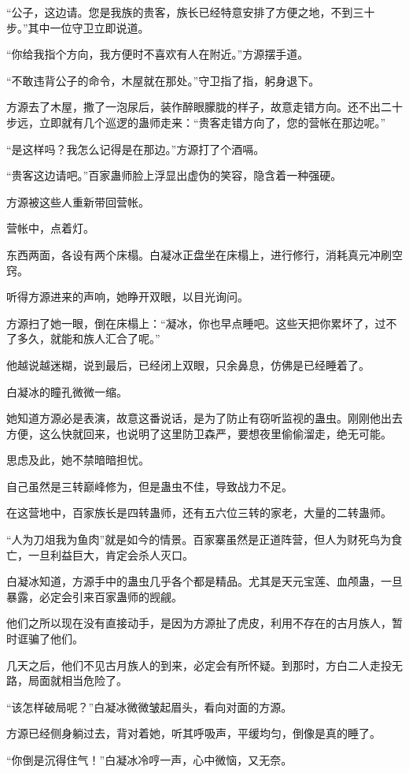 \begin{this_body}
“公子，这边请。您是我族的贵客，族长已经特意安排了方便之地，不到三十步。”其中一位守卫立即说道。

“你给我指个方向，我方便时不喜欢有人在附近。”方源摆手道。

“不敢违背公子的命令，木屋就在那处。”守卫指了指，躬身退下。

方源去了木屋，撒了一泡尿后，装作醉眼朦胧的样子，故意走错方向。还不出二十步远，立即就有几个巡逻的蛊师走来：“贵客走错方向了，您的营帐在那边呢。”

“是这样吗？我怎么记得是在那边。”方源打了个酒嗝。

“贵客这边请吧。”百家蛊师脸上浮显出虚伪的笑容，隐含着一种强硬。

方源被这些人重新带回营帐。

营帐中，点着灯。

东西两面，各设有两个床榻。白凝冰正盘坐在床榻上，进行修行，消耗真元冲刷空窍。

听得方源进来的声响，她睁开双眼，以目光询问。

方源扫了她一眼，倒在床榻上：“凝冰，你也早点睡吧。这些天把你累坏了，过不了多久，就能和族人汇合了呢。”

他越说越迷糊，说到最后，已经闭上双眼，只余鼻息，仿佛是已经睡着了。

白凝冰的瞳孔微微一缩。

她知道方源必是表演，故意这番说话，是为了防止有窃听监视的蛊虫。刚刚他出去方便，这么快就回来，也说明了这里防卫森严，要想夜里偷偷溜走，绝无可能。

思虑及此，她不禁暗暗担忧。

自己虽然是三转巅峰修为，但是蛊虫不佳，导致战力不足。

在这营地中，百家族长是四转蛊师，还有五六位三转的家老，大量的二转蛊师。

“人为刀俎我为鱼肉”就是如今的情景。百家寨虽然是正道阵营，但人为财死鸟为食亡，一旦利益巨大，肯定会杀人灭口。

白凝冰知道，方源手中的蛊虫几乎各个都是精品。尤其是天元宝莲、血颅蛊，一旦暴露，必定会引来百家蛊师的觊觎。

他们之所以现在没有直接动手，是因为方源扯了虎皮，利用不存在的古月族人，暂时诓骗了他们。

几天之后，他们不见古月族人的到来，必定会有所怀疑。到那时，方白二人走投无路，局面就相当危险了。

“该怎样破局呢？”白凝冰微微皱起眉头，看向对面的方源。

方源已经侧身躺过去，背对着她，听其呼吸声，平缓均匀，倒像是真的睡了。

“你倒是沉得住气！”白凝冰冷哼一声，心中微恼，又无奈。


\end{this_body}

